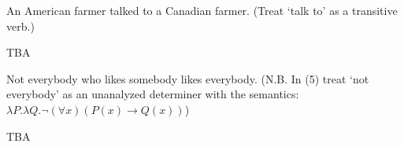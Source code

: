\begin{QandA}
\begin{answered}
         \end{answered}
   \item An American farmer talked to a Canadian farmer. (Treat ‘talk to’ as a transitive verb.)
         \begin{answered}
		 TBA
         \end{answered}
   \item Not everybody who likes somebody likes everybody. (N.B. In (5) treat ‘not everybody’ as an unanalyzed determiner with the semantics:
   $\lambda P. \lambda Q. \neg (\forall x)(P(x)\rightarrow Q(x))$)
         \begin{answered}
		 TBA
         \end{answered}
\end{QandA}